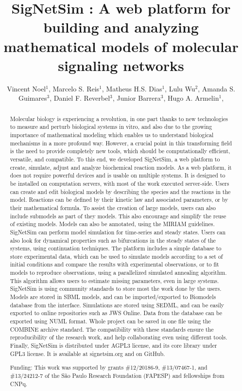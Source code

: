 \documentclass[twoside]{article}
\title{\vspace{-15mm}\fontsize{24pt}{10pt}\selectfont\textbf{ SigNetSim : A web platform for building and analyzing mathematical models of molecular signaling networks }} %
\author{ Vincent Noel$^{1}$, Marcelo S. Reis$^{1}$, Matheus H.S. Dias$^{1}$, Lulu Wu$^{2}$, Amanda S. Guimares$^{3}$, Daniel F. Reverbel$^{3}$, Junior Barrera$^{3}$, Hugo A. Armelin$^{1}$, }
\affil{ 1 Instituto Butantan

2 Center of Toxins, Immune-response and Cell Signaling, Instituto Butantan

3 Instituto de Matemática e Estatística, Universidade de São Paulo

 }
\date{}
\begin{document}
  
  
  \maketitle %
  
  
  \thispagestyle{fancy} %
  
  
  \begin{abstract}
  Molecular biology is experiencing a revolution, in one part thanks to new technologies to measure and perturb biological systems in vitro, and also due to the growing importance of mathematical modeling which enables us to understand biological mechanisms in a more profound way. However, a crucial point in this transforming field is the need to provide completely new tools, which should be computationally efficient, versatile, and compatible. To this end, we developed SigNetSim, a web platform to create, simulate, adjust and analyze biochemical reaction models. As a web platform, it does not require powerful devices and is usable on multiple systems. It is designed to be installed on computation servers, with most of the work executed server-side. Users can create and edit biological models by describing the species and the reactions in the model. Reactions can be defined by their kinetic law and associated parameters, or by their mathematical formula. To assist the creation of large models, users can also include submodels as part of they models. This also encourage and simplify the reuse of existing models. Models can also be annotated, using the MIRIAM guidelines. SigNetSim can perform model simulation for time-series and steady states. Users can also look for dynamical properties such as bifurcations in the steady states of the systems, using continuation techniques. The platform includes a simple database to store experimental data, which can be used to simulate models according to a set of initial conditions and compare the results with experimental observations, or to fit models to reproduce observations, using a parallelized simulated annealing algorithm. This algorithm allows users to estimate missing parameters, even in large systems. SigNetSim is using community standards to store most the work done by the users. Models are stored in SBML models, and can be imported/exported to Biomodels database from the interface. Simulations are stored using SEDML, and can be easily exported to online repositories such as JWS Online. Data from the database can be exported using NUML format. Whole project can be saved in one file using the COMBINE archive standard. The compatibility with these standards ensure the reproducibility of the research work, and help collaborating even using different tools. Finally, SigNetSim is distributed under AGPL3 license, and its core library under GPL3 license. It is available at signetsim.org and on GitHub.
  
  Funding: This work was supported by grants \#12/20186-9, \#13/07467-1, and \#13/24212-7 of the S\~ao Paulo Research Foundation (FAPESP) and fellowships from CNPq. \\ 
  \end{abstract}
  
\end{document}
